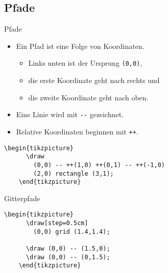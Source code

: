 \subsection{Pfade}

\begin{Frame}[fragile]{Pfade}
  \begin{itemize}
    \item Ein Pfad ist eine Folge von Koordinaten.
      \begin{itemize}
        \item Links unten ist der Ursprung \lstinline-(0,0)-,
        \item die erste Koordinate geht nach rechts und
        \item die zweite Koordinate geht nach oben.
      \end{itemize}
    \item Eine Linie wird mit \lstinline|--| gezeichnet.
    \item Relative Koordinaten beginnen mit \lstinline-++-.
  \end{itemize}

  \xxx


  \xxx

  \begin{lstlisting}[gobble=4]
    \begin{tikzpicture}
      \draw
        (0,0) -- ++(1,0) ++(0,1) -- ++(-1,0)
        (2,0) rectangle (3,1);
    \end{tikzpicture}
  \end{lstlisting}
\end{Frame}

\begin{Frame}[t,fragile]{Gitterpfade}

  \xxx

  \begin{lstlisting}[gobble=4]
    \begin{tikzpicture}
      \draw[step=0.5cm]
        (0,0) grid (1.4,1.4);

      \draw (0,0) -- (1.5,0);
      \draw (0,0) -- (0,1.5);
    \end{tikzpicture}
  \end{lstlisting}
\end{Frame}

